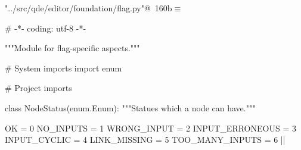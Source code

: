 \documentclass[%
    a4paper,    %
    justified,  %
    nobib,      %
    openany     %
]{tufte-book}
\begin{document}
\begin{flushleft} \small
\begin{minipage}{\linewidth}\label{scrap190}\raggedright\small
{} \verb@"../src/qde/editor/foundation/flag.py"@\nobreak\ {\footnotesize {160b}}$\equiv$
\vspace{-1ex}
\begin{pythoncode}
# -*- coding: utf-8 -*-

"""Module for flag-specific aspects."""

# System imports
import enum

# Project imports


class NodeStatus(enum.Enum):
    """Statues which a node can have."""

    OK              = 0
    NO_INPUTS       = 1
    WRONG_INPUT     = 2
    INPUT_ERRONEOUS = 3
    INPUT_CYCLIC    = 4
    LINK_MISSING    = 5
    TOO_MANY_INPUTS = 6
|\NWsep|
\end{pythoncode}
\vspace{1.5ex}
\footnotesize
\begin{list}{}{\setlength{\itemsep}{-\parsep}\setlength{\itemindent}{-\leftmargin}}

\item{}
\end{list}
\end{minipage}\vspace{4ex}
\end{flushleft}
\end{document}
